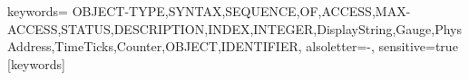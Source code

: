 {keywords=
	{OBJECT-TYPE,SYNTAX,SEQUENCE,OF,ACCESS,MAX-ACCESS,STATUS,DESCRIPTION,INDEX,INTEGER,DisplayString,Gauge,PhysAddress,TimeTicks,Counter,OBJECT,IDENTIFIER},
	alsoletter=-,
	sensitive=true %
}[keywords]